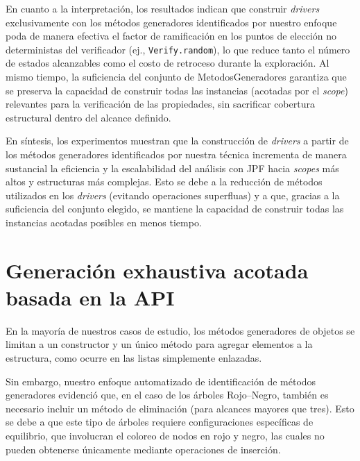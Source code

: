 En cuanto a la interpretación, los resultados indican que construir \emph{drivers}
exclusivamente con los métodos generadores identificados por nuestro enfoque
poda de manera efectiva el factor de ramificación en los puntos de elección
no deterministas del verificador (ej., \texttt{Verify.random}), lo que reduce
tanto el número de estados alcanzables como el costo de retroceso durante la
exploración. Al mismo tiempo, la suficiencia del conjunto de \textsf{MetodosGeneradores}
garantiza que se preserva la capacidad de construir todas las instancias
(acotadas por el \emph{scope}) relevantes para la verificación de las propiedades,
sin sacrificar cobertura estructural dentro del alcance definido.

En síntesis, los experimentos muestran que la construcción de \emph{drivers} a
partir de los métodos generadores identificados por nuestra técnica incrementa de
manera sustancial la eficiencia y la escalabilidad del análisis con JPF hacia
\emph{scopes} más altos y estructuras más complejas. Esto se debe a la reducción
de métodos utilizados en los \emph{drivers} (evitando operaciones superfluas) y a
que, gracias a la suficiencia del conjunto elegido, se mantiene la capacidad
de construir todas las instancias acotadas posibles en menos tiempo.



\section{Generación exhaustiva acotada basada en la API}
\label{sec:experimentalBeapi}


En la mayoría de nuestros casos de estudio, los métodos generadores de objetos se limitan a un 
constructor y un único método para agregar elementos a la estructura, como ocurre en las listas 
simplemente enlazadas.  

Sin embargo, nuestro enfoque automatizado de identificación de métodos generadores evidenció que, 
en el caso de los árboles Rojo–Negro, también es necesario incluir un método de eliminación 
(para alcances mayores que tres).  
Esto se debe a que este tipo de árboles requiere configuraciones específicas de equilibrio, 
que involucran el coloreo de nodos en rojo y negro, las cuales no pueden obtenerse únicamente 
mediante operaciones de inserción.

